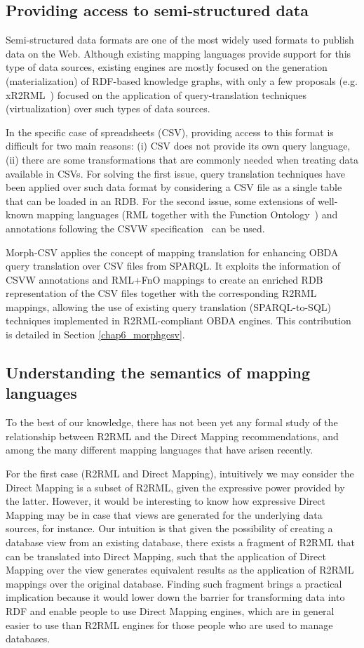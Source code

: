 \subsection{Providing access to semi-structured data}
Semi-structured data formats are one of the most widely used formats to publish data on the Web. Although existing mapping languages provide support for this type of data sources, existing engines are mostly focused on the generation (materialization) of RDF-based knowledge graphs, with only a few proposals (e.g. xR2RML~\citep{michel2015translation}) focused on the application of query-translation techniques (virtualization) over such types of data sources.

In the specific case of spreadsheets (CSV), providing access to this format is difficult for two main reasons: (i) CSV does not provide its own query language, (ii) there are some transformations that are commonly needed when treating data available in CSVs. For solving the first issue, query translation techniques have been applied over such data format by considering a CSV file as a single table that can be loaded in an RDB. For the second issue, some extensions of well-known mapping languages (RML together with the Function Ontology~\citep{de2017declarative}) and annotations following the CSVW specification~\citep{tennison2015model} can be used.

Morph-CSV applies the concept of mapping translation for enhancing OBDA query translation over CSV files from SPARQL. It exploits the information of CSVW annotations and RML+FnO mappings to create an enriched RDB representation of the CSV files together with the corresponding R2RML mappings, allowing the use of existing query translation (SPARQL-to-SQL) techniques implemented in R2RML-compliant OBDA engines. This contribution is detailed in Section \ref{chap6_morphgcsv}.


\subsection{Understanding the semantics of mapping languages}
To the best of our knowledge, there has not been yet any formal study of the relationship between R2RML and the Direct Mapping recommendations, and among the many different mapping languages that have arisen recently.

For the first case (R2RML and Direct Mapping), intuitively we may consider the Direct Mapping is a subset of R2RML, given the expressive power provided by the latter. However, it would be interesting to know how expressive Direct Mapping may be in case that views are generated for the underlying data sources, for instance. Our intuition is that given the possibility of creating a database view from an existing database, there exists a fragment of R2RML that can be translated into Direct Mapping, such that the application of Direct Mapping over the view generates equivalent results as the application of R2RML mappings over the original database. Finding such fragment brings a practical implication because it would lower down the barrier for transforming data into RDF and enable people to use Direct Mapping engines, which are in general easier to use than R2RML engines for those people who are used to manage databases.

